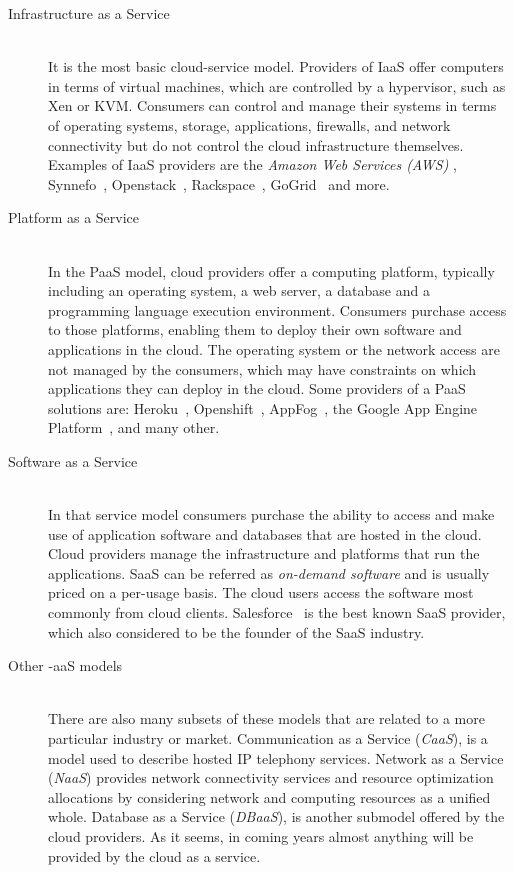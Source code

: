 \begin{description}
  \item[Infrastructure as a Service] \hfill \\
    It is the most basic cloud-service model. Providers of IaaS offer computers
    in terms of virtual machines, which are controlled by a hypervisor, such as
    Xen or KVM. Consumers can control and manage their systems in terms of
    operating systems, storage, applications, firewalls, and network connectivity
    but do not control the cloud infrastructure themselves. Examples of IaaS
    providers are the \emph{Amazon Web Services (AWS)}
    , Synnefo~,
    Openstack~,
    Rackspace~, GoGrid~
    and more.
  \item[Platform as a Service] \hfill \\
    In the PaaS model, cloud providers offer a computing platform, typically
    including an operating system, a web server, a database and a programming
    language execution environment. Consumers purchase access to those platforms,
    enabling them to deploy their own software and applications in the cloud. The
    operating system or the network access are not managed by the consumers, which
    may have constraints on which applications they can deploy in the cloud. Some
    providers of a PaaS solutions are: Heroku~,
    Openshift~,
    AppFog~, the Google App Engine
    Platform~, and many other.
  \item[Software as a Service] \hfill \\
    In that service model consumers purchase the ability to access and make use
    of application software and databases that are hosted in the cloud. Cloud
    providers manage the infrastructure and platforms that run the applications.
    SaaS can be referred as \emph{on-demand software} and is usually priced on a
    per-usage basis. The cloud users access the software most commonly from
    cloud clients. Salesforce~ is the best
    known SaaS provider, which also considered to be the founder of the SaaS
    industry.
  \item[Other -aaS models] \hfill \\
    There are also many subsets of these models that are related to a more
    particular industry or market. Communication as a Service (\emph{CaaS}), is a
    model used to describe hosted IP telephony services. Network as a Service
    (\emph{NaaS}) provides network connectivity services and resource optimization
    allocations by considering network and computing resources as a unified
    whole. Database as a Service (\emph{DBaaS}), is another submodel offered
    by the cloud providers. As it seems, in coming years almost anything will
    be provided by the cloud as a service.
\end{description}

